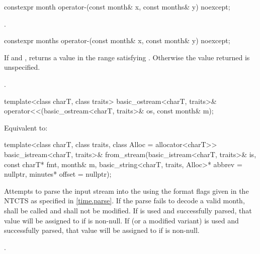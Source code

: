 %
\begin{itemdecl}
constexpr month operator-(const month& x, const months& y) noexcept;
\end{itemdecl}

\begin{itemdescr}
\pnum
\returns
{}.
\end{itemdescr}

%
\begin{itemdecl}
constexpr months operator-(const month& x, const month& y) noexcept;
\end{itemdecl}

\begin{itemdescr}
\pnum
\returns
If 
and ,
returns a value 
in the range 
satisfying .
Otherwise the value returned is unspecified.
\begin{example}
.
\end{example}
\end{itemdescr}

%
\begin{itemdecl}
template<class charT, class traits>
  basic_ostream<charT, traits>&
    operator<<(basic_ostream<charT, traits>& os, const month& m);
\end{itemdecl}

\begin{itemdescr}
\pnum
\effects
Equivalent to:
\end{itemdescr}

%
\begin{itemdecl}
template<class charT, class traits, class Alloc = allocator<charT>>
  basic_istream<charT, traits>&
    from_stream(basic_istream<charT, traits>& is, const charT* fmt,
                month& m, basic_string<charT, traits, Alloc>* abbrev = nullptr,
                minutes* offset = nullptr);
\end{itemdecl}

\begin{itemdescr}
\pnum
\effects
Attempts to parse the input stream 
into the   using
the format flags given in the NTCTS 
as specified in \ref{time.parse}.
If the parse fails to decode a valid month,
 shall be called
and  shall not be modified.
If  is used and successfully parsed,
that value will be assigned to  if  is non-null.
If  (or a modified variant) is used and successfully parsed,
that value will be assigned to  if  is non-null.

\pnum
\returns
{}.
\end{itemdescr}

